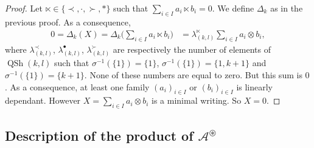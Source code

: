 \documentclass[10pt,a4paper]{amsart}
\numberwithin{equation}{section}
\theoremstyle{definition}
\theoremstyle{plain}
\DeclareMathOperator{\batc}{QSh}
\begin{document}
\begin{proof}
Let $\ltimes\in\{\prec,\cdot,\succ,*\}$ such that $\sum_{i\in I} a_i\ltimes b_i=0$.
 We define $\Delta_k$ as in the previous proof. As a consequence,
\begin{align*}
	0=\Delta_k(X)=\Delta_k\bigg( \sum_{i\in I} a_i\ltimes b_i \bigg)&=\lambda^{\ltimes}_{(k,l)}\sum_{i\in I} a_i\otimes b_i,
\end{align*}
where $\lambda_{(k,l)}^{\prec}$, $\lambda_{(k,l)}^{\bullet}$, $\lambda_{(k,l)}^{\succ}$ are respectively the number of elements of $\batc(k,l)$ such that $\sigma^{-1}\!(\{1\})\!=\{1\}$, $\sigma^{-1}(\{1\})=\{1,k+1\}$ and $\sigma^{-1}(\{1\})=\{k+1\}$. None of these numbers are equal to zero. But this sum is $0$. As a consequence, at least one family $(a_i)_{i\in I}$ or $(b_i)_{i\in I}$ is linearly dependant. However $ X=\sum_{i\in I}a_i\otimes b_i$ is a minimal writing. So $X=0$.
\end{proof}

\subsection[Description of the product of A\^{}\{circledast\}]{Description of the product of $\boldsymbol{\mathcal{A}^{\circledast}}$}
\end{document}
